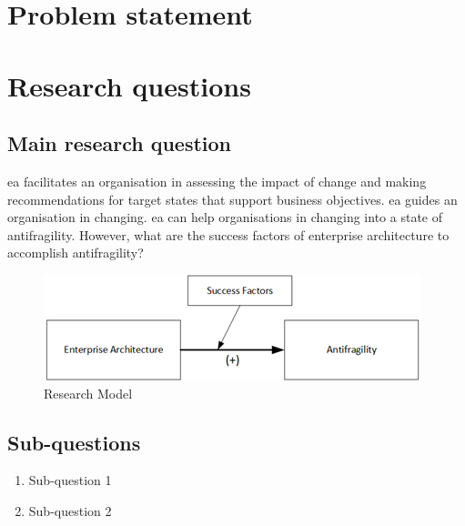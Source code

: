 \section{Problem statement}
\label{sec:problemstatement}

\section{Research questions}
\label{sec:research-questions}

\subsection{Main research question}
\label{sub:main-research-question}
\acrshort{ea} facilitates an organisation in assessing the impact of change and making recommendations for target states that support business objectives. \acrshort{ea} guides an organisation in changing. \acrshort{ea} can help organisations in changing into a state of \gls{antifragility}. However, what are the success factors of enterprise architecture to accomplish \gls{antifragility}?
\begin{figure}[!h]
	\centering
	\includegraphics[width=0.7\linewidth]{images/conceptmodel}
	\caption[Research Model]{Research Model}
	\label{fig:researchmodel}
\end{figure}
\begin{center}
\end{center}

\subsection{Sub-questions}
\label{sub:sub-questions}

\begin{enumerate}
	\item{Sub-question 1}
	\item{Sub-question 2}
\end{enumerate}

